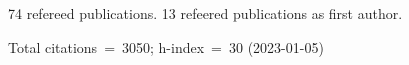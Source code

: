 74 refereed publications. 13 refeered publications as first author.

Total citations~=~3050; h-index~=~30 (2023-01-05)